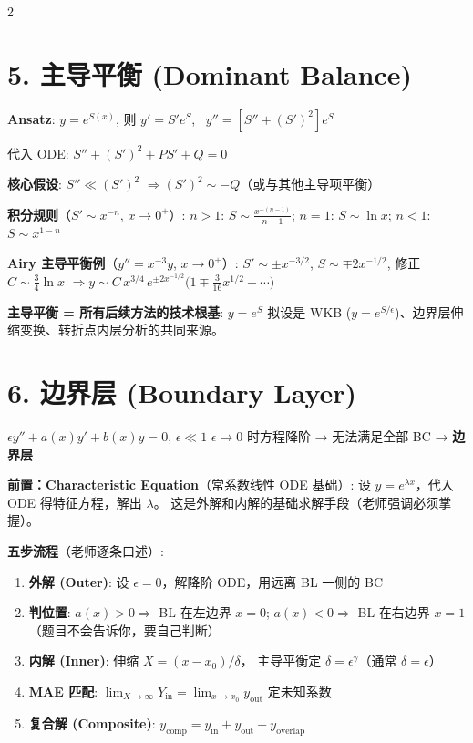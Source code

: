 \documentclass[10pt,a4paper]{article}
\newcommand{\eps}{\epsilon}
\begin{document}
\begin{multicols}{2}
\section{5. 主导平衡 (Dominant Balance)}

\textbf{Ansatz}: $y = e^{S(x)}$, 则
$y' = S' e^S$, \ $y'' = [S'' + (S')^2] e^S$

代入 ODE: $S'' + (S')^2 + P S' + Q = 0$

\textbf{核心假设}: $S'' \ll (S')^2$
$\Rightarrow (S')^2 \sim -Q$（或与其他主导项平衡）

\textbf{积分规则}（$S' \sim x^{-n}$, $x \to 0^+$）:
$n>1$: $S \sim \frac{x^{-(n-1)}}{n-1}$;
$n=1$: $S \sim \ln x$;
$n<1$: $S \sim x^{1-n}$

\textbf{Airy 主导平衡例}（$y'' = x^{-3}y$, $x \to 0^+$）:
$S' \sim \pm x^{-3/2}$, $S \sim \mp 2x^{-1/2}$,
修正 $C \sim \frac{3}{4}\ln x$
$\Rightarrow y \sim C\,x^{3/4}\,e^{\pm 2x^{-1/2}}\bigl(1 \mp \frac{3}{16}x^{1/2} + \cdots\bigr)$

\textbf{主导平衡 = 所有后续方法的技术根基}:
$y = e^S$ 拟设是 WKB ($y = e^{S/\eps}$)、边界层伸缩变换、转折点内层分析的共同来源。


\section{6. 边界层 (Boundary Layer)}

$\eps y'' + a(x)y' + b(x)y = 0$, $\eps \ll 1$\;
$\eps \to 0$ 时方程降阶 → 无法满足全部 BC → \textbf{边界层}

\textbf{前置：Characteristic Equation}（常系数线性 ODE 基础）:
设 $y = e^{\lambda x}$，代入 ODE 得特征方程，解出 $\lambda$。
这是外解和内解的基础求解手段（老师强调必须掌握）。

\textbf{五步流程}（老师逐条口述）:
\begin{enumerate}
\item \textbf{外解 (Outer)}: 设 $\eps = 0$，解降阶 ODE，用远离 BL 一侧的 BC
\item \textbf{判位置}: $a(x) > 0 \Rightarrow$ BL 在左边界 $x=0$;
  $a(x) < 0 \Rightarrow$ BL 在右边界 $x=1$（题目不会告诉你，要自己判断）
\item \textbf{内解 (Inner)}: 伸缩 $X = (x-x_0)/\delta$，
  主导平衡定 $\delta = \eps^\gamma$（通常 $\delta = \eps$）
\item \textbf{MAE 匹配}: $\displaystyle\lim_{X\to\infty} Y_{\text{in}} = \lim_{x\to x_0} y_{\text{out}}$
  定未知系数
\item \textbf{复合解 (Composite)}:
  $y_{\text{comp}} = y_{\text{in}} + y_{\text{out}} - y_{\text{overlap}}$
\end{enumerate}


\end{multicols}
\end{document}
